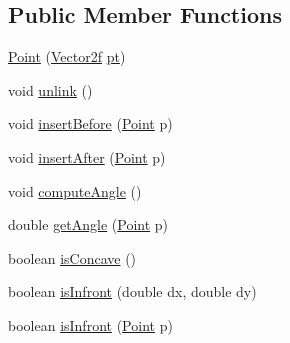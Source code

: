 \subsection*{Public Member Functions}
\begin{DoxyCompactItemize}
\item 
\mbox{\hyperlink{classorg_1_1newdawn_1_1slick_1_1geom_1_1_mann_triangulator_1_1_point_aadb7397067180e5b2f28f1ffb777e081}{Point}} (\mbox{\hyperlink{classorg_1_1newdawn_1_1slick_1_1geom_1_1_vector2f}{Vector2f}} \mbox{\hyperlink{classorg_1_1newdawn_1_1slick_1_1geom_1_1_mann_triangulator_1_1_point_afd78802a3fe9d6abf60a218d24be56aa}{pt}})
\item 
void \mbox{\hyperlink{classorg_1_1newdawn_1_1slick_1_1geom_1_1_mann_triangulator_1_1_point_ab1fcabe1e621db257798b3923ec80a05}{unlink}} ()
\item 
void \mbox{\hyperlink{classorg_1_1newdawn_1_1slick_1_1geom_1_1_mann_triangulator_1_1_point_afd6f758bff5fb93dc7ebc2921ce9ad95}{insert\+Before}} (\mbox{\hyperlink{classorg_1_1newdawn_1_1slick_1_1geom_1_1_mann_triangulator_1_1_point}{Point}} p)
\item 
void \mbox{\hyperlink{classorg_1_1newdawn_1_1slick_1_1geom_1_1_mann_triangulator_1_1_point_a5e973d8a1a5afd94b86a5f5e779b7daf}{insert\+After}} (\mbox{\hyperlink{classorg_1_1newdawn_1_1slick_1_1geom_1_1_mann_triangulator_1_1_point}{Point}} p)
\item 
void \mbox{\hyperlink{classorg_1_1newdawn_1_1slick_1_1geom_1_1_mann_triangulator_1_1_point_a61201245a3be65aae48cc8a678e7d4ac}{compute\+Angle}} ()
\item 
double \mbox{\hyperlink{classorg_1_1newdawn_1_1slick_1_1geom_1_1_mann_triangulator_1_1_point_abe597472af2a9ca75990c933750aece5}{get\+Angle}} (\mbox{\hyperlink{classorg_1_1newdawn_1_1slick_1_1geom_1_1_mann_triangulator_1_1_point}{Point}} p)
\item 
boolean \mbox{\hyperlink{classorg_1_1newdawn_1_1slick_1_1geom_1_1_mann_triangulator_1_1_point_a36120f090914969755d93e0c2df0b256}{is\+Concave}} ()
\item 
boolean \mbox{\hyperlink{classorg_1_1newdawn_1_1slick_1_1geom_1_1_mann_triangulator_1_1_point_a9b2abef9a42ad4116972c02fc47e7c24}{is\+Infront}} (double dx, double dy)
\item 
boolean \mbox{\hyperlink{classorg_1_1newdawn_1_1slick_1_1geom_1_1_mann_triangulator_1_1_point_a3203f9e49f30cd4001c103dcc1a5263e}{is\+Infront}} (\mbox{\hyperlink{classorg_1_1newdawn_1_1slick_1_1geom_1_1_mann_triangulator_1_1_point}{Point}} p)
\end{DoxyCompactItemize}
